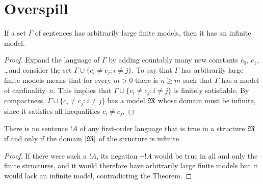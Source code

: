 \documentclass[open-logic-section]{subfiles}
\begin{document}
\section{Overspill}

\begin{thm}
  If a set $\Gamma$ of sentences has arbitrarily large finite models,
  then it has an infinite model.
\end{thm}

\begin{proof}
  Expand the language of $\Gamma$ by adding countably many new
  constants $c_0$, $c_1$, \dots and consider the set $\Gamma \cup
  \{c_i \neq c_j : i \neq j\}$. To say that $\Gamma$ has arbitrarily
  large finite models means that for every $m >0$ there is $n\ge m$
  such that $\Gamma$ has a model of cardinality~$n$. This implies that
  $\Gamma \cup \{c_i \neq c_j : i \neq j\}$ is finitely
  satisfiable. By compactness, $\Gamma \cup \{c_i \neq c_j : i \neq
  j\}$ has a model $\mathfrak M$ whose domain must be infinite, since it
  satisfies all inequalities $c_i \neq c_j$.
\end{proof}

\begin{prop}
  There is no sentence $!A$ of any first-order language
  that is true in a structure $\mathfrak M$ if and only
  if the domain $\left| \mathfrak M \right|$ of the structure is infinite.
\end{prop}

\begin{proof}
  If there were such a $!A$, its negation $\lnot !A$ would
  be true in all and only the finite structures, and it would
  therefore have arbitrarily large finite models but it would lack an
  infinite model, contradicting the Theorem.
\end{proof}
\end{document}
